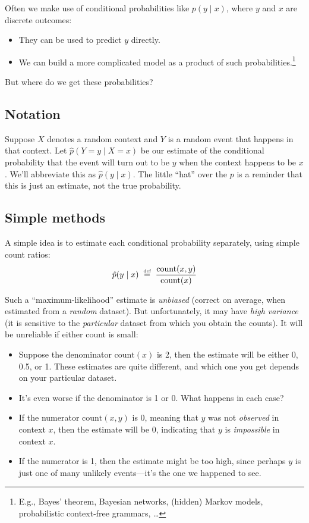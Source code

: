 \documentclass[11pt]{article}
\newcommand{\defeq}{\;\stackrel{\mbox{\tiny def}}{=}\;}
\newcommand{\ph}{\hat{p}}
\begin{document}
Often we make use of conditional probabilities like $p(y \mid x)$, where
$y$ and $x$ are discrete outcomes:
\begin{itemize}[noitemsep]
\item They can be used to predict $y$ directly.
\item We can build a more complicated model as a product
  of such probabilities.\footnote{E.g., Bayes' theorem, Bayesian
    networks, (hidden) Markov models, probabilistic context-free
    grammars, \ldots}
\end{itemize}
But where do we get these probabilities?

\subsection{Notation}

Suppose $X$ denotes a random context and $Y$ is a random event that
happens in that context.  Let $\ph(Y=y \mid X=x)$ be our estimate of
the conditional probability that the event will turn out to be $y$ when
the context happens to be $x$.  We'll abbreviate this as
$\ph(y\mid x)$.  The little ``hat'' over the $p$ is a reminder that
this is just an estimate, not the true probability.

\subsection{Simple methods}\label{sec:mle}

A simple idea is to estimate each conditional probability separately,
using simple count ratios: 
\begin{equation}
\ph(y \mid x) \defeq \frac{\textrm{count}(x,y)}{\textrm{count}(x)}
\end{equation}

Such a ``maximum-likelihood'' estimate is {\em unbiased} (correct on
average, when estimated from a {\em random} dataset).  But unfortunately, it
may have {\em high variance} (it is sensitive to the {\em particular}
dataset from which you obtain the counts).  It will be unreliable if
either count is small:
\begin{itemize}[noitemsep]
\item Suppose the denominator $\textrm{count}(x)$ is 2, then the estimate
  will be either 0, 0.5, or 1.  These estimates are quite different,
  and which one you get depends on your particular dataset.  
\item It's even worse if the denominator is 1 or 0.  What happens in
  each case?
\item If the numerator $\textrm{count}(x,y)$ is 0, meaning that $y$
  was not {\em observed} in context $x$, then the estimate will
  be 0, indicating that $y$ is {\em impossible} in context $x$.  
\item If the numerator is 1, then the estimate might be too high,
  since perhaps $y$ is just one of many unlikely events---it's the one
  we happened to see.
\end{itemize}
\end{document}
